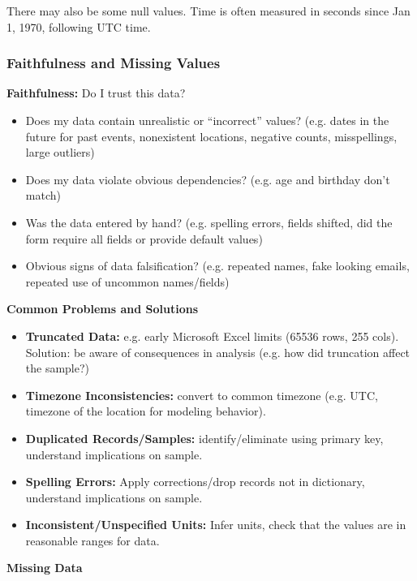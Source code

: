 There may also be some null values. Time is often measured in seconds since Jan 1, 1970, following UTC time.

\subsubsection{Faithfulness and Missing Values}

\textbf{Faithfulness:} Do I trust this data?
\begin{itemize}
\item Does my data contain unrealistic or ``incorrect'' values? (e.g. dates in the future for past events, nonexistent locations, negative counts, misspellings, large outliers)
\item Does my data violate obvious dependencies? (e.g. age and birthday don't match)
\item Was the data entered by hand? (e.g. spelling errors, fields shifted, did the form require all fields or provide default values)
\item Obvious signs of data falsification? (e.g. repeated names, fake looking emails, repeated use of uncommon names/fields)
\end{itemize}

\textbf{Common Problems and Solutions}
\begin{itemize}
\item \textbf{Truncated Data:} e.g. early Microsoft Excel limits (65536 rows, 255 cols). Solution: be aware of consequences in analysis (e.g. how did truncation affect the sample?)
\item \textbf{Timezone Inconsistencies:} convert to common timezone (e.g. UTC, timezone of the location for modeling behavior).
\item \textbf{Duplicated Records/Samples:} identify/eliminate using primary key, understand implications on sample.
\item \textbf{Spelling Errors:} Apply corrections/drop records not in dictionary, understand implications on sample.
\item \textbf{Inconsistent/Unspecified Units:} Infer units, check that the values are in reasonable ranges for data.
\end{itemize}

\textbf{Missing Data}

